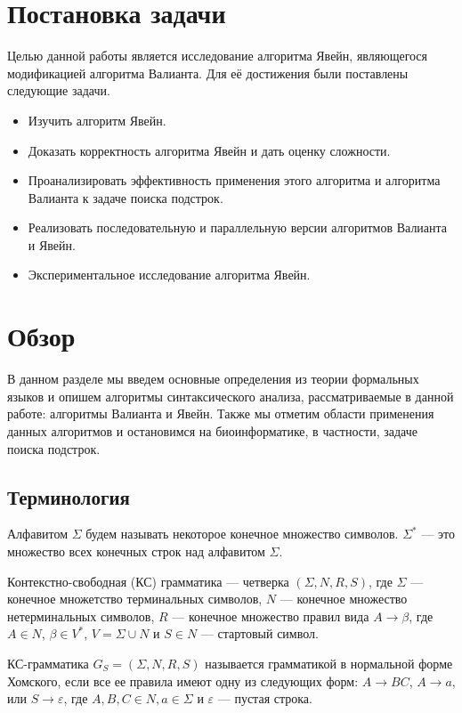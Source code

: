 \documentclass[14pt]{matmex-diploma-custom}
\begin{document}
\section{Постановка задачи}

Целью данной работы является исследование алгоритма Явейн, являющегося модификацией алгоритма Валианта.
Для её достижения были поставлены следующие задачи.

\begin{itemize}
	\item Изучить алгоритм Явейн.
	\item Доказать корректность алгоритма Явейн и дать оценку сложности.
	\item Проанализировать эффективность применения этого алгоритма и алгоритма Валианта к задаче поиска подстрок.
	\item Реализовать последовательную и параллельную версии алгоритмов Валианта и Явейн.
	\item Экспериментальное исследование алгоритма Явейн.
\end{itemize}
	

\section{Обзор}

В данном разделе мы введем основные определения из теории формальных языков и опишем алгоритмы синтаксического анализа, рассматриваемые в данной работе: алгоритмы Валианта и Явейн. Также мы отметим области применения данных алгоритмов и остановимся на биоинформатике, в частности, задаче поиска подстрок.

\subsection{Терминология}

Алфавитом $\Sigma$ будем называть некоторое конечное множество символов.
$\Sigma^{*}$ --- это множество всех конечных строк над алфавитом $\Sigma$.

Контекстно-свободная (КС) грамматика --- четверка $(\Sigma, N, R, S)$, где $\Sigma$ --- конечное множетство терминальных символов, $N$ --- конечное множество нетерминальных символов, $R$ --- конечное множество правил вида $A \rightarrow \beta$, где $A \in N$, $\beta \in V^{*}$, $V = \Sigma \cup N$ и $S \in N$ --- стартовый символ.

КС-грамматика $G_S = (\Sigma, N, R, S)$ называется грамматикой в нормальной форме Хомского, если все ее правила имеют одну из следующих форм: $A \rightarrow BC$, $A \rightarrow a$, или $S \rightarrow \varepsilon$, 
где $A, B, C \in N, a \in \Sigma$ и $\varepsilon$ --- пустая строка.
\end{document}
